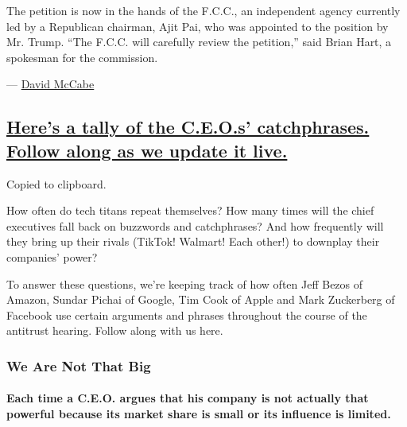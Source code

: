 The petition is now in the hands of the F.C.C., an independent agency
currently led by a Republican chairman, Ajit Pai, who was appointed to
the position by Mr. Trump. ``The F.C.C. will carefully review the
petition,'' said Brian Hart, a spokesman for the commission.

--- \href{https://www.nytimes3xbfgragh.onion/by/david-mccabe}{David
McCabe}

\hypertarget{heres-a-tally-of-the-ceos-catchphrases-follow-along-as-we-update-it-live}{%
\subsection{\texorpdfstring{\protect\hyperlink{what-ceos-said}{Here's a
tally of the C.E.O.s' catchphrases. Follow along as we update it
live.}}{Here's a tally of the C.E.O.s' catchphrases. Follow along as we update it live.}}\label{heres-a-tally-of-the-ceos-catchphrases-follow-along-as-we-update-it-live}}

Copied to clipboard.

How often do tech titans repeat themselves? How many times will the
chief executives fall back on buzzwords and catchphrases? And how
frequently will they bring up their rivals (TikTok! Walmart! Each
other!) to downplay their companies' power?

To answer these questions, we're keeping track of how often Jeff Bezos
of Amazon, Sundar Pichai of Google, Tim Cook of Apple and Mark
Zuckerberg of Facebook use certain arguments and phrases throughout the
course of the antitrust hearing. Follow along with us here.

\hypertarget{we-are-not-that-big}{%
\subsubsection{We Are Not That Big}\label{we-are-not-that-big}}

\hypertarget{each-time-a-ceo-argues-that-his-company-is-not-actually-that-powerful-because-its-market-share-is-small-or-its-influence-is-limited}{%
\paragraph{Each time a C.E.O. argues that his company is not actually
that powerful because its market share is small or its influence is
limited.}\label{each-time-a-ceo-argues-that-his-company-is-not-actually-that-powerful-because-its-market-share-is-small-or-its-influence-is-limited}}

